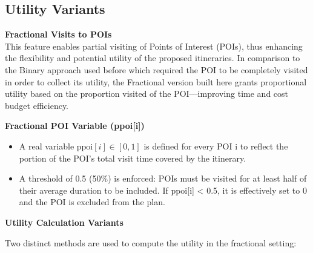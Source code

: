 \subsection{Utility Variants}

\noindent \textbf{Fractional Visits to POIs}\\
This feature enables partial visiting of Points of Interest (POIs), thus enhancing the flexibility and potential utility of the proposed itineraries. In comparison to the Binary approach used before which required the POI to be completely visited in order to collect its utility, the Fractional version built here grants proportional utility based on the proportion visited of the POI—improving time and cost budget efficiency.

\textbf{Fractional POI Variable (ppoi[i])}
\begin{itemize}
    \item A real variable $\text{ppoi}[i] \in [0, 1]$ is defined for every POI i to reflect the portion of the POI's total visit time covered by the itinerary.

    \item A threshold of 0.5 (50\%) is enforced: POIs must be visited for at least half of their average duration to be included. If ppoi[i] < 0.5, it is effectively set to 0 and the POI is excluded from the plan.
\end{itemize}

\textbf{Utility Calculation Variants}
\label{Utility_Calculation}

Two distinct methods are used to compute the utility in the fractional setting:


